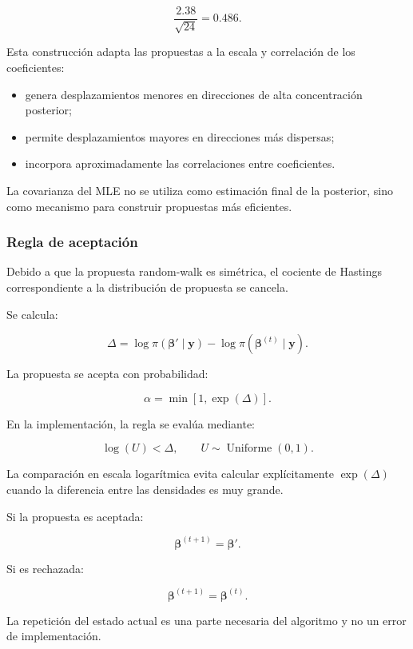 \[
\frac{2.38}{\sqrt{24}}
=
0.486.
\]

Esta construcción adapta las propuestas a la escala y correlación de los
coeficientes:

\begin{itemize}
    \item genera desplazamientos menores en direcciones de alta
    concentración posterior;

    \item permite desplazamientos mayores en direcciones más dispersas;

    \item incorpora aproximadamente las correlaciones entre
    coeficientes.
\end{itemize}

La covarianza del MLE no se utiliza como estimación final de la posterior,
sino como mecanismo para construir propuestas más eficientes.

\subsubsection{Regla de aceptación}

Debido a que la propuesta random-walk es simétrica, el cociente de
Hastings correspondiente a la distribución de propuesta se cancela.

Se calcula:

\[
\Delta
=
\log
\pi
\left(
    \boldsymbol{\beta}'
    \mid
    \mathbf{y}
\right)
-
\log
\pi
\left(
    \boldsymbol{\beta}^{(t)}
    \mid
    \mathbf{y}
\right).
\]

La propuesta se acepta con probabilidad:

\[
\alpha
=
\min
\left[
    1,
    \exp(\Delta)
\right].
\]

En la implementación, la regla se evalúa mediante:

\[
\log(U)<\Delta,
\qquad
U\sim\operatorname{Uniforme}(0,1).
\]

La comparación en escala logarítmica evita calcular explícitamente
\(\exp(\Delta)\) cuando la diferencia entre las densidades es muy grande.

Si la propuesta es aceptada:

\[
\boldsymbol{\beta}^{(t+1)}
=
\boldsymbol{\beta}'.
\]

Si es rechazada:

\[
\boldsymbol{\beta}^{(t+1)}
=
\boldsymbol{\beta}^{(t)}.
\]

La repetición del estado actual es una parte necesaria del algoritmo y no
un error de implementación.

